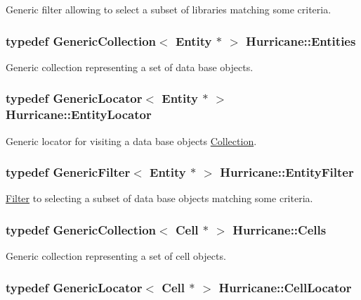 Generic filter allowing to select a subset of libraries matching some criteria. \hypertarget{namespaceHurricane_af50ef2888fd2a5b58b0de14cdfaabc56}{
\subsubsection[{Entities}]{\setlength{\rightskip}{0pt plus 5cm}typedef {\bf Generic\-Collection}$<$ {\bf Entity} $\ast$ $>$ {\bf Hurricane\-::\-Entities}}}\label{namespaceHurricane_af50ef2888fd2a5b58b0de14cdfaabc56}
Generic collection representing a set of data base objects. \hypertarget{namespaceHurricane_ad3f039057bc40adfd993d83ace24fb83}{
\subsubsection[{Entity\-Locator}]{\setlength{\rightskip}{0pt plus 5cm}typedef {\bf Generic\-Locator}$<$ {\bf Entity} $\ast$ $>$ {\bf Hurricane\-::\-Entity\-Locator}}}\label{namespaceHurricane_ad3f039057bc40adfd993d83ace24fb83}
Generic locator for visiting a data base objects \hyperlink{classHurricane_1_1Collection}{Collection}. \hypertarget{namespaceHurricane_af0fe741a1ef28dedcb26bf979b1dea5c}{
\subsubsection[{Entity\-Filter}]{\setlength{\rightskip}{0pt plus 5cm}typedef {\bf Generic\-Filter}$<$ {\bf Entity} $\ast$ $>$ {\bf Hurricane\-::\-Entity\-Filter}}}\label{namespaceHurricane_af0fe741a1ef28dedcb26bf979b1dea5c}
\hyperlink{classHurricane_1_1Filter}{Filter} to selecting a subset of data base objects matching some criteria. \hypertarget{namespaceHurricane_a8b4ab14b26f36f43d83a50294410b44a}{
\subsubsection[{Cells}]{\setlength{\rightskip}{0pt plus 5cm}typedef {\bf Generic\-Collection}$<$ {\bf Cell} $\ast$ $>$ {\bf Hurricane\-::\-Cells}}}\label{namespaceHurricane_a8b4ab14b26f36f43d83a50294410b44a}
Generic collection representing a set of cell objects. \hypertarget{namespaceHurricane_abd99adab3b5944a4d1ace3d0b0b34f57}{
\subsubsection[{Cell\-Locator}]{\setlength{\rightskip}{0pt plus 5cm}typedef {\bf Generic\-Locator}$<$ {\bf Cell} $\ast$ $>$ {\bf Hurricane\-::\-Cell\-Locator}}}\label{namespaceHurricane_abd99adab3b5944a4d1ace3d0b0b34f57}

